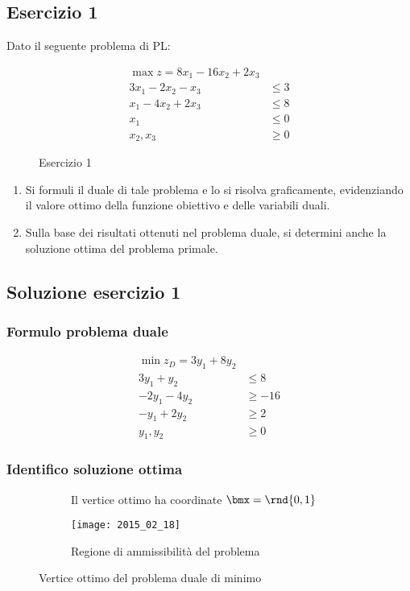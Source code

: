 \documentclass[\main/main.tex]{subfiles}
\begin{document}
\subsection{Esercizio 1}
Dato il seguente problema di PL:

\begin{figure}
  \begin{align*}
    \max z = 8x_1 -16x_2 + 2x_3 \\
    3x_1 -2x_2 - x_3 & \leq 3   \\
    x_1 -4x_2 + 2x_3 & \leq 8   \\
    x_1              & \leq 0   \\
    x_2, x_3         & \geq 0
  \end{align*}
  \caption{Esercizio 1}
\end{figure}

\begin{enumerate}
  \item Si formuli il duale di tale problema e lo si risolva graficamente, evidenziando il valore ottimo della funzione obiettivo e delle variabili duali.
  \item Sulla base dei risultati ottenuti nel problema duale, si determini anche la soluzione ottima del problema primale.
\end{enumerate}

\subsection{Soluzione esercizio 1}

\subsubsection*{Formulo problema duale}
\begin{align*}
  \min z_D= 3y_1 + 8y_2  \\
  3y_1 + y_2  & \leq 8   \\
  -2y_1 -4y_2 & \geq -16 \\
  -y_1 + 2y_2 & \geq 2   \\
  y_1, y_2    & \geq 0
\end{align*}

\subsubsection*{Identifico soluzione ottima}

\begin{figure}
  \begin{subfigure}{0.49\textwidth}
    \caption{Il vertice ottimo ha coordinate $\bmx = \rnd{0,1}$}
  \end{subfigure}
  \begin{subfigure}{0.49\textwidth}
    \texttt{[image: 2015\_02\_18]}
    \caption{Regione di ammissibilità del problema}
  \end{subfigure}
  \caption{Vertice ottimo del problema duale di minimo}
\end{figure}
\end{document}
